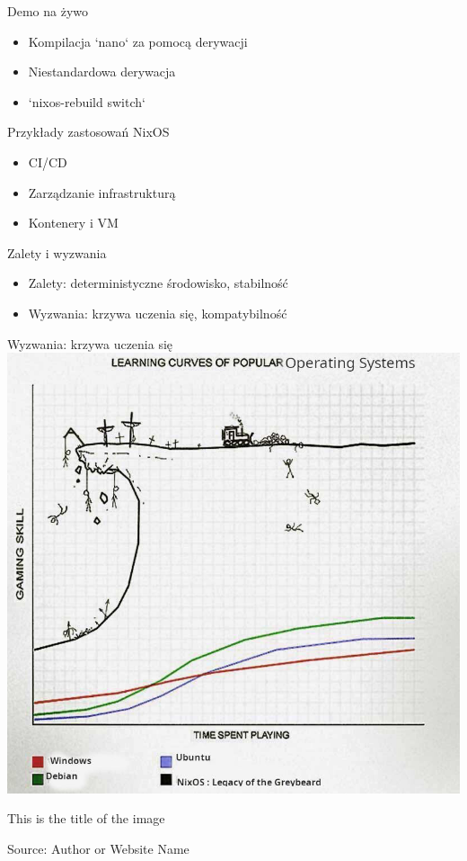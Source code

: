 \documentclass{beamer}
\begin{document}
\begin{frame}{Demo na żywo}
    \begin{itemize}
        \item Kompilacja `nano` za pomocą derywacji
        \item Niestandardowa derywacja
        \item `nixos-rebuild switch`
    \end{itemize}
\end{frame}

\begin{frame}{Przykłady zastosowań NixOS}
    \begin{itemize}
        \item CI/CD
        \item Zarządzanie infrastrukturą
        \item Kontenery i VM
    \end{itemize}
\end{frame}

\begin{frame}{Zalety i wyzwania}
    \begin{itemize}
        \item Zalety: deterministyczne środowisko, stabilność
        \item Wyzwania: krzywa uczenia się, kompatybilność
    \end{itemize}
\end{frame}

\begin{frame}{Wyzwania: krzywa uczenia się}
    \centering
    \includegraphics[width=0.8\linewidth, height=0.8\textheight]{./assets/nixoscurve.jpg}
    \caption{This is the title of the image}
    \captionsetup{justification=centering} %
    \caption*{\footnotesize Source: Author or Website Name} %
\end{frame}
\end{document}
